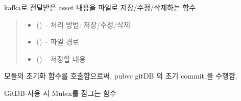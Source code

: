 \documentclass[a4paper,10pt,english]{sphinxmanual}
\begin{document}
\begin{fulllineitems}
\begin{fulllineitems}
\label{\detokenize{_VCModule:vcModule.editFile}}
\pysigstartsignatures
{}
\pysigstopsignatures
\sphinxAtStartPar
kafka로 전달받은 asset 내용을 파일로 저장/수정/삭제하는 함수
\begin{quote}\begin{description}
\begin{itemize}
\item {} 
\sphinxAtStartPar
{} () – 처리 방법: 저장/수정/삭제

\item {} 
\sphinxAtStartPar
{} () – 파일 경로

\item {} 
\sphinxAtStartPar
{} () – 저장할 내용

\end{itemize}

\end{description}\end{quote}

\end{fulllineitems}


\begin{fulllineitems}
\label{\detokenize{_VCModule:vcModule.init}}
\pysigstartsignatures
{}
\pysigstopsignatures
\sphinxAtStartPar
{} 모듈의 초기화 함수를 호출함으로써, pubvc gitDB 의 초기 commit 을 수행함.

\end{fulllineitems}


\begin{fulllineitems}
\label{\detokenize{_VCModule:vcModule.lockMutex}}
\pysigstartsignatures
{}
\pysigstopsignatures
\sphinxAtStartPar
GitDB 사용 시 Mutex를 잠그는 함수


\end{fulllineitems}
\end{fulllineitems}
\end{document}
